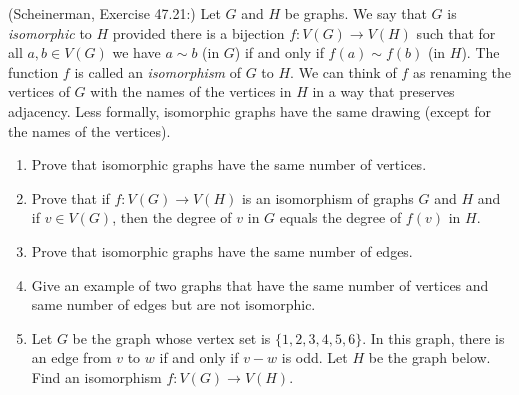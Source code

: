 \documentclass{article}
\theoremstyle{definition}
\begin{document}
\begin{question}
    (Scheinerman, Exercise 47.21:)
    Let  $G$ and $H$ be graphs.  We say that $G$ is \emph{isomorphic} to $H$
    provided there is a bijection $f \colon V(G) \to V(H)$ such that
    for all $a,b \in V(G)$ we have $a \sim b$ (in $G$) if and only if $f(a) \sim
    f(b)$ (in $H$).  The function $f$ is called an \emph{isomorphism} of $G$ to
    $H$.  We can think of $f$ as renaming the vertices of $G$ with the names of
    the vertices in $H$ in a way that preserves adjacency.  Less formally,
    isomorphic graphs have the same drawing (except for the names of the
    vertices).
    \begin{enumerate}
        \item Prove that isomorphic graphs have the same number of vertices.
        \item Prove that  if $f \colon V(G) \to V(H)$ is an
            isomorphism of graphs $G$ and $H$ and if $v \in V(G)$, then the
            degree of $v$ in $G$ equals the degree of $f(v)$ in $H$.
        \item Prove that isomorphic graphs have the same number of edges.
        \item Give an example of two graphs that have the same number of
            vertices and same number of edges but are not isomorphic.
        \item Let $G$ be the graph whose vertex set is $\{ 1,2,3,4,5,6\}$.  In
            this graph, there is an edge from $v$ to $w$ if and only if $v-w$ is
            odd.  Let $H$ be the graph below.  Find an
            isomorphism $f \colon V(G) \to V(H)$.
    \end{enumerate}
    \begin{center}
    \end{center}
\end{question}
\end{document}
